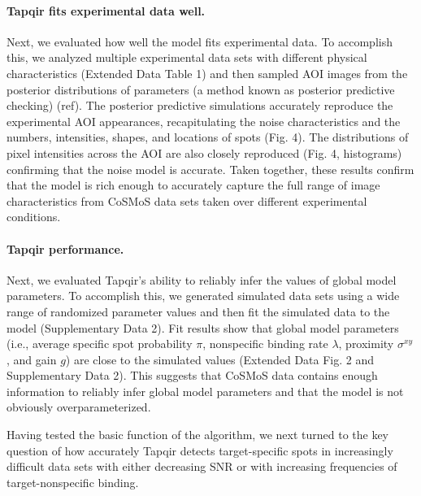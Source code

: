 \paragraph{Tapqir fits experimental data well.}
Next, we evaluated how well the model fits experimental data. To accomplish this, we analyzed multiple experimental data sets with different physical characteristics (Extended Data Table 1) and then sampled AOI images from the posterior distributions of parameters (a method known as posterior predictive checking) (ref). The posterior predictive simulations accurately reproduce the experimental AOI appearances, recapitulating the noise characteristics and the numbers, intensities, shapes, and locations of spots (Fig. 4).  The distributions of pixel intensities across the AOI are also closely reproduced (Fig. 4, histograms) confirming that the noise model is accurate. Taken together, these results confirm that the model is rich enough to accurately capture the full range of image characteristics from CoSMoS data sets taken over different experimental conditions.

\paragraph{Tapqir performance.}
Next, we evaluated Tapqir's ability to reliably infer the values of global model parameters. To  accomplish this, we generated simulated data sets  using  a wide range of randomized parameter values and then fit the simulated data to the model (Supplementary Data 2). Fit results show that global model parameters (i.e., average specific spot probability $\pi$, nonspecific binding rate $\lambda$, proximity $\sigma^{xy}$, and gain $g$) are close to the simulated values  (Extended Data Fig. 2 and Supplementary Data 2). This suggests that CoSMoS data contains enough information to reliably infer global model parameters and that the model is not obviously overparameterized.

Having tested the basic function of the algorithm, we next turned to the key question of how accurately Tapqir detects target-specific spots in increasingly difficult data sets with either decreasing SNR or with increasing frequencies of target-nonspecific binding.  

